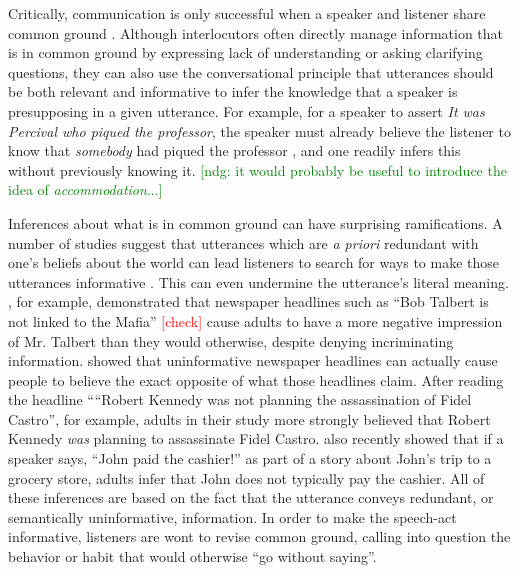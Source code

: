 \documentclass[10pt,letterpaper]{article}
\newcommand{\red}[1]{\textcolor{Red}{#1}}
\newcommand{\ndg}[1]{\textcolor{Green}{[ndg: #1]}}
\begin{document}
Critically, communication is only successful when a speaker and listener share common ground \cite{Clark1996}.
Although interlocutors often directly manage information that is in common ground by  expressing lack of understanding or asking clarifying questions, they can also use the conversational principle that utterances should be both relevant and informative \cite{Grice1975} to infer the knowledge that a speaker is presupposing in a given utterance.
For example, for a speaker to assert \emph{It was Percival who piqued the professor}, the speaker must already believe the listener to know that \emph{somebody} had piqued the professor \cite{Clark1977}, and one readily infers this without previously knowing it. 
\ndg{it would probably be useful to introduce the idea of \emph{accommodation}...}

Inferences about what is in common ground can have surprising ramifications.
A number of studies suggest that utterances which are \emph{a priori} redundant with one's beliefs about the world can lead listeners to search for ways to make those utterances informative \cite{Yandell1979, Wegner1981, Gruenfeld1992, Kravtchenko2015, Degen2015}.  
This can even undermine the utterance's literal meaning.  
, for example, demonstrated that newspaper headlines such as ``Bob Talbert is not linked to the Mafia'' \red{[check]} cause adults to have a more negative impression of Mr. Talbert than they would otherwise, despite denying incriminating information.  
 showed that uninformative newspaper headlines can actually cause people to believe the exact opposite of what those headlines claim.  
After reading the headline ``“Robert Kennedy was not planning the assassination of Fidel Castro'', for example, adults in their study more strongly believed that Robert Kennedy \emph{was} planning to assassinate Fidel Castro.
 also recently showed that if a speaker says, ``John paid the cashier!'' as part of a story about John's trip to a grocery store, adults infer that John does not typically pay the cashier.  
All of these inferences are based on the fact that the utterance conveys redundant, or semantically uninformative, information.
In order to make the speech-act informative, listeners are wont to revise common ground, calling into question the behavior or habit that would otherwise ``go without saying''.


\end{document}
